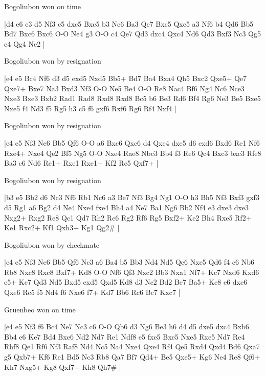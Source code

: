 \showboard

Bogoliubon won on time

\makegametitle
|d4 e6 e3 d5 Nf3 c5 dxc5 Bxc5 b3 Nc6 Ba3 Qe7 Bxc5 Qxc5 a3 Nf6 b4 Qd6 Bb5 Bd7 Bxc6 Bxc6 O-O Ne4 g3 O-O c4 Qe7 Qd3 dxc4 Qxc4 Nd6 Qd3 Bxf3 Nc3 Qg5 e4 Qg4 Ne2  |

\showboard

Bogoliubon won by resignation

\makegametitle
|e4 e5 Bc4 Nf6 d3 d5 exd5 Nxd5 Bb5+ Bd7 Ba4 Bxa4 Qh5 Bxc2 Qxe5+ Qe7 Qxe7+ Bxe7 Na3 Bxd3 Nf3 O-O Ne5 Be4 O-O Re8 Nac4 Bf6 Ng4 Nc6 Nce3 Nxe3 Bxe3 Bxb2 Rad1 Rad8 Rxd8 Rxd8 Bc5 b6 Be3 Rd6 Bf4 Rg6 Ne3 Be5 Bxe5 Nxe5 f4 Nd3 f5 Rg5 h3 c5 f6 gxf6 Rxf6 Rg6 Rf4 Nxf4  |

\showboard

Bogoliubon won by resignation

\makegametitle
|e4 e5 Nf3 Nc6 Bb5 Qf6 O-O a6 Bxc6 Qxc6 d4 Qxe4 dxe5 d6 exd6 Bxd6 Re1 Nf6 Rxe4+ Nxe4 Qe2 Bf5 Ng5 O-O Nxe4 Rae8 Nbc3 Bb4 f3 Re6 Qc4 Bxc3 bxc3 Rfe8 Ba3 c6 Nd6 Re1+ Rxe1 Rxe1+ Kf2 Re5 Qxf7+  |

\showboard

Bogoliubon won by resignation

\makegametitle
|b3 e5 Bb2 d6 Nc3 Nf6 Rb1 Nc6 a3 Be7 Nf3 Bg4 Ng1 O-O h3 Bh5 Nf3 Bxf3 gxf3 d5 Rg1 a6 Bg2 d4 Ne4 Nxe4 fxe4 Bh4 a4 Ne7 Ba1 Ng6 Bb2 Nf4 e3 dxe3 dxe3 Nxg2+ Rxg2 Re8 Qc1 Qd7 Rh2 Re6 Rg2 Rf6 Rg5 Bxf2+ Ke2 Bh4 Rxe5 Rf2+ Ke1 Rxc2+ Kf1 Qxh3+ Kg1 Qg2\#  |

\showboard

Bogoliubon won by checkmate

\makegametitle
|e4 e5 Nf3 Nc6 Bb5 Qf6 Nc3 a6 Ba4 b5 Bb3 Nd4 Nd5 Qc6 Nxe5 Qd6 f4 c6 Nb6 Rb8 Nxc8 Rxc8 Bxf7+ Kd8 O-O Nf6 Qf3 Nxc2 Bb3 Nxa1 Nf7+ Kc7 Nxd6 Kxd6 e5+ Kc7 Qd3 Nd5 Bxd5 cxd5 Qxd5 Kd8 d3 Nc2 Bd2 Be7 Ba5+ Ke8 e6 dxe6 Qxe6 Rc5 f5 Nd4 f6 Nxe6 f7+ Kd7 Bb6 Rc6 Bc7 Kxc7  |

\showboard

Gruenbeo won on time

\makegametitle
|e4 e5 Nf3 f6 Bc4 Ne7 Nc3 c6 O-O Qb6 d3 Ng6 Be3 h6 d4 d5 dxe5 dxc4 Bxb6 Bb4 e6 Ke7 Bd4 Bxe6 Nd2 Nd7 Re1 Ndf8 e5 fxe5 Bxe5 Nxe5 Rxe5 Nd7 Re4 Rhf8 Qe1 Rf6 Nf3 Raf8 Nd4 Nc5 Na4 Nxe4 Qxe4 Rf4 Qe5 Rxd4 Qxd4 Bd6 Qxa7 g5 Qxb7+ Kf6 Re1 Bd5 Nc3 Rb8 Qa7 Bf7 Qd4+ Be5 Qxe5+ Kg6 Ne4 Re8 Qf6+ Kh7 Nxg5+ Kg8 Qxf7+ Kh8 Qh7\#  |

